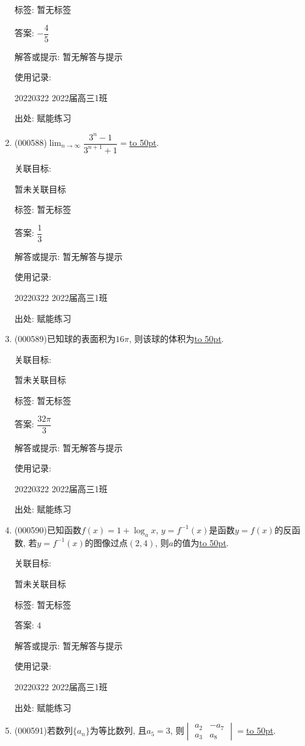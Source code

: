 \documentclass[10pt,a4paper]{article}
\newcommand{\blank}[1]{\underline{\hbox to #1pt{}}}
\begin{document}
\begin{enumerate}[1.]
标签: 暂无标签

答案: $-\dfrac 45$

解答或提示: 暂无解答与提示

使用记录:

20220322	2022届高三1班	


出处: 赋能练习
\item { (000588)}$\displaystyle\lim_{n\to\infty}\dfrac{3^n-1}{3^{n+1}+1}=$\blank{50}.


关联目标:

暂未关联目标



标签: 暂无标签

答案: $\dfrac 13$

解答或提示: 暂无解答与提示

使用记录:

20220322	2022届高三1班	


出处: 赋能练习
\item { (000589)}已知球的表面积为$16\pi$, 则该球的体积为\blank{50}.


关联目标:

暂未关联目标



标签: 暂无标签

答案: $\dfrac{32\pi }3$

解答或提示: 暂无解答与提示

使用记录:

20220322	2022届高三1班	


出处: 赋能练习
\item { (000590)}已知函数$f(x)=1+\log_a x$, $y=f^{-1}(x)$是函数$y=f(x)$的反函数, 若$y=f^{-1}(x)$的图像过点$(2,4)$, 则$a$的值为\blank{50}.


关联目标:

暂未关联目标



标签: 暂无标签

答案: $4$

解答或提示: 暂无解答与提示

使用记录:

20220322	2022届高三1班	


出处: 赋能练习
\item { (000591)}若数列$\{a_n\}$为等比数列, 且$a_5=3$, 则$\begin{vmatrix} a_2 & -a_7 \\ a_3 & a_8 \end{vmatrix}=$\blank{50}.



\end{enumerate}
\end{document}
